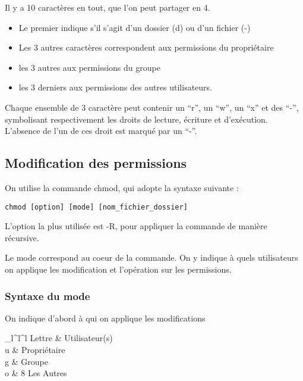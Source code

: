 \documentclass[french]{yLectureNote}
\begin{document}
Il y a 10 caractères en tout, que l'on peut partager en 4.

\begin{itemize}
 \item Le premier indique s'il s'agit d'un dossier (d) ou d'un fichier (-)
 \item Les 3 autres caractères correspondent aux permissions du propriétaire
 \item les 3 autres aux permissions du groupe
 \item les 3 derniers aux permissions des autres utilisateurs.
\end{itemize}

Chaque ensemble de 3 caractère peut contenir un ``r'', un ``w'', un ``x'' et des ``-'', symbolisant respectivement les droits de lecture, écriture et d'exécution. L'absence de l'un de ces droit est marqué par un ``-''.
\subsection{Modification des permissions}
On utilise la commande chmod, qui adopte la syntaxe suivante :

\texttt{chmod [option] [mode] [nom\_fichier\_dossier]}

L'option la plus utilisée est -R, pour appliquer la commande de manière récursive.

Le mode correspond au coeur de la commande. On y indique à quels utilisateurs on applique les modification et l'opération sur les permissions.
\subsubsection{Syntaxe du mode}
On indique d'abord à qui on applique les modifications

	\begin{tabular}{_l^l^l}
		\tableHeaderStyle%
		Lettre & Utilisateur(s)\\
		u & Propriétaire\\
		g & Groupe\\
		o & 8 Les Autres\\
	\end{tabular}
\end{document}
